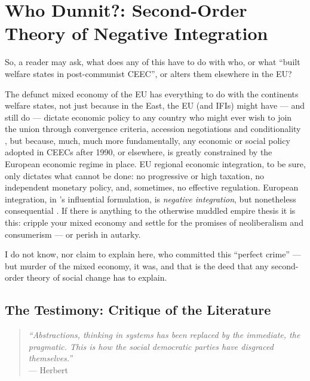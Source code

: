 \documentclass[11pt,a4paper,oneside,openright]{article}
\begin{document}
\section{Who Dunnit?: Second-Order Theory of Negative Integration} \label{sec:who_dunnit}

So, a reader may ask, what does any of this have to do with who, or what  ``built welfare states in post-communist \gls{CEEC}'', or alters them elsewhere in the \gls{EU}? 

The defunct mixed economy of the \gls{EU} has everything to do with the continents welfare states, not just because in the East, the \gls{EU} (and \glspl{IFI}) might have --- and still do --- dictate economic policy to any country who might ever wish to join the union through convergence criteria, accession negotiations and conditionality \citep[55]{Bonker2006}, but because, much, much more fundamentally, any economic or social policy adopted in \glspl{CEEC} after 1990, or elsewhere, is greatly constrained by the European economic regime in place. 
\gls{EU} regional economic integration, to be sure, only dictates what cannot be done: 
no progressive or high taxation, no independent monetary policy, and, sometimes, no effective regulation. 
European integration, in \citeauthor{Scharpf1997}'s influential formulation, is \emph{negative integration}, but nonetheless consequential \citep{Scharpf1997}. 
If there is anything to the otherwise muddled empire thesis \citep{BeckGrande-2007-aa} it is this: 
cripple your mixed economy and settle for the promises of neoliberalism and consumerism --- or perish in autarky.

I do not know, nor claim to explain here, who committed this ``perfect crime'' \citep{Galbraith2002a} --- but murder of the mixed economy, it was, and that is the deed that any second-order theory of social change has to explain.

\subsection[Literature]{The Testimony: Critique of the Literature} \label{sec:Literature}

\begin{quote}
	\emph{``Abstractions, thinking in systems has been replaced by the immediate, the pragmatic. 
	This is how the social democratic parties have disgraced themselves.''}\\
	--- Herbert \cite[41]{Schui2009}
\end{quote}
\end{document}
